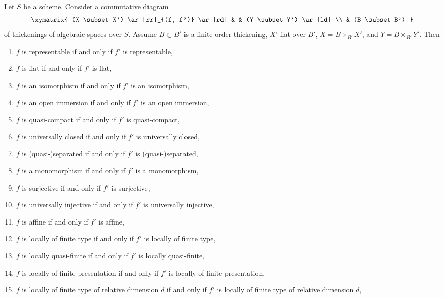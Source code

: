 \begin{lemma}
\label{lemma-deform-property}
Let $S$ be a scheme. Consider a commutative diagram
$$
\xymatrix{
(X \subset X') \ar[rr]_{(f, f')} \ar[rd] & & (Y \subset Y') \ar[ld] \\
& (B \subset B')
}
$$
of thickenings of algebraic spaces over $S$. Assume $B \subset B'$
is a finite order thickening, $X'$ flat over $B'$, $X = B \times_{B'} X'$,
and $Y = B \times_{B'} Y'$. Then
\begin{enumerate}
\item $f$ is representable if and only if $f'$ is representable,
\label{item-representable}
\item $f$ is flat if and only if $f'$ is flat,
\label{item-flat}
\item $f$ is an isomorphism if and only if $f'$ is an isomorphism,
\label{item-isomorphism}
\item $f$ is an open immersion if and only if $f'$ is an open immersion,
\label{item-open-immersion}
\item $f$ is quasi-compact if and only if $f'$ is quasi-compact,
\label{item-quasi-compact}
\item $f$ is universally closed if and only if $f'$ is universally closed,
\label{item-universally-closed}
\item $f$ is (quasi-)separated if and only if $f'$ is (quasi-)separated,
\label{item-separated}
\item $f$ is a monomorphism if and only if $f'$ is a monomorphism,
\label{item-monomorphism}
\item $f$ is surjective if and only if $f'$ is surjective,
\label{item-surjective}
\item $f$ is universally injective if and only if $f'$ is universally injective,
\label{item-universally-injective}
\item $f$ is affine if and only if $f'$ is affine,
\label{item-affine}
\item
\label{item-finite-type}
$f$ is locally of finite type if and only if $f'$ is locally of finite type,
\item $f$ is locally quasi-finite if and only if $f'$ is locally quasi-finite,
\label{item-quasi-finite}
\item
\label{item-finite-presentation}
$f$ is locally of finite presentation if and only if $f'$ is locally of
finite presentation,
\item
\label{item-relative-dimension-d}
$f$ is locally of finite type of relative dimension $d$ if and only if
$f'$ is locally of finite type of relative dimension $d$,

\end{enumerate}
\end{lemma}
